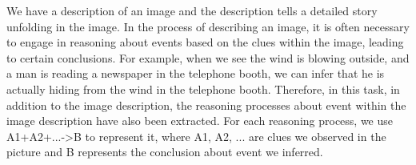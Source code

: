 \begin{figure*}
    \small
    \begin{tcolorbox}[
      colframe = blue!30!white, 
      colback = blue!2!white,
      colbacktitle = blue!10!white,
      colupper = black, collower = yellow!75!red,
      coltitle = black!90!white
      ]
    We have a description of an image and the description tells a detailed story unfolding in the image. In the process of describing an image, it is often necessary to engage in reasoning about events based on the clues within the image, leading to certain conclusions. For example, when we see the wind is blowing outside, and a man is reading a newspaper in the telephone booth, we can infer that he is actually hiding from the wind in the telephone booth. Therefore, in this task, in addition to the image description, the reasoning processes about event within the image description have also been extracted. For each reasoning process, we use A1+A2+...->B to represent it, where A1, A2, ... are clues we observed in the picture and B represents the conclusion about event we inferred. \\


\end{tcolorbox}
\end{figure*}
